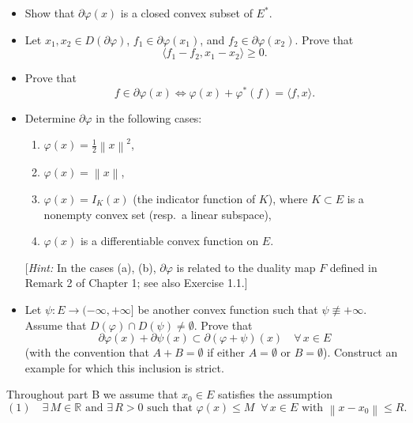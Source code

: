 \documentclass[12pt]{article}
\newcommand{\norm}[1]{\left\|#1\right\|}
\newcommand{\ip}[2]{\langle #1, #2 \rangle}
\newcommand{\R}{\mathbb{R}}
\begin{document}
\begin{itemize}
\item[A1.] Show that $\partial\varphi(x)$ is a closed convex subset of $E^*$.

\item[2.] Let $x_1, x_2 \in D(\partial\varphi)$, $f_1 \in \partial\varphi(x_1)$, and $f_2 \in \partial\varphi(x_2)$. Prove that
\[
\ip{f_1 - f_2}{x_1 - x_2} \ge 0.
\]

\item[3.] Prove that
\[
f \in \partial\varphi(x) \iff \varphi(x) + \varphi^*(f) = \ip{f}{x}.
\]

\item[4.] Determine $\partial\varphi$ in the following cases:
\begin{enumerate}
    \item[(a)] $\varphi(x) = \tfrac{1}{2}\norm{x}^2$,
    \item[(b)] $\varphi(x) = \norm{x}$,
    \item[(c)] $\varphi(x) = I_K(x)$ (the indicator function of $K$), where $K \subset E$ is a nonempty
    convex set (resp.\ a linear subspace),
    \item[(d)] $\varphi(x)$ is a differentiable convex function on $E$.
\end{enumerate}
[\textit{Hint:} In the cases (a), (b), $\partial\varphi$ is related to the duality map $F$ defined in Remark 2
of Chapter 1; see also Exercise 1.1.]

\item[5.] Let $\psi : E \to (-\infty,+\infty]$ be another convex function such that $\psi \not\equiv +\infty$.
Assume that $D(\varphi) \cap D(\psi) \neq \emptyset$. Prove that
\[
\partial\varphi(x) + \partial\psi(x) \subset \partial(\varphi + \psi)(x) \quad \forall\, x \in E
\]
(with the convention that $A + B = \emptyset$ if either $A = \emptyset$ or $B = \emptyset$). Construct an
example for which this inclusion is strict.
\end{itemize}

\medskip

\noindent Throughout part B we assume that $x_0 \in E$ satisfies the assumption
\[
(1)\quad \exists\, M \in \R \text{ and } \exists\, R > 0 \text{ such that } \varphi(x) \le M\;\;
\forall\, x \in E \text{ with } \norm{x - x_0} \le R.
\]
\end{document}
